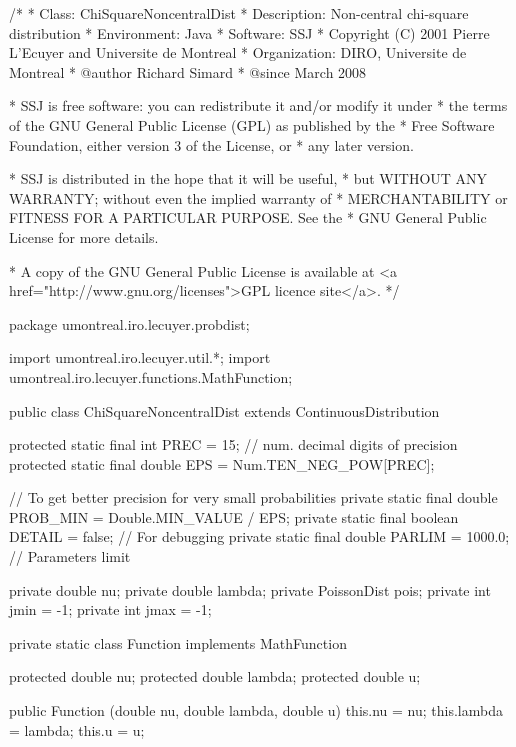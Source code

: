 \begin{code}\begin{hide}
/*
 * Class:        ChiSquareNoncentralDist
 * Description:  Non-central chi-square distribution
 * Environment:  Java
 * Software:     SSJ
 * Copyright (C) 2001  Pierre L'Ecuyer and Universite de Montreal
 * Organization: DIRO, Universite de Montreal
 * @author       Richard Simard
 * @since        March 2008

 * SSJ is free software: you can redistribute it and/or modify it under
 * the terms of the GNU General Public License (GPL) as published by the
 * Free Software Foundation, either version 3 of the License, or
 * any later version.

 * SSJ is distributed in the hope that it will be useful,
 * but WITHOUT ANY WARRANTY; without even the implied warranty of
 * MERCHANTABILITY or FITNESS FOR A PARTICULAR PURPOSE.  See the
 * GNU General Public License for more details.

 * A copy of the GNU General Public License is available at
   <a href="http://www.gnu.org/licenses">GPL licence site</a>.
 */
\end{hide}
package umontreal.iro.lecuyer.probdist;
\begin{hide}
import umontreal.iro.lecuyer.util.*;
import umontreal.iro.lecuyer.functions.MathFunction;
\end{hide}

public class ChiSquareNoncentralDist extends ContinuousDistribution\begin{hide} {

   protected static final int PREC = 15;   // num. decimal digits of precision
   protected static final double EPS = Num.TEN_NEG_POW[PREC];

   // To get better precision for very small probabilities
   private static final double PROB_MIN = Double.MIN_VALUE / EPS;
   private static final boolean DETAIL = false;   // For debugging
   private static final double PARLIM = 1000.0;   // Parameters limit

   private double nu;
   private double lambda;
   private PoissonDist pois;
   private int jmin = -1;
   private int jmax = -1;

   private static class Function implements MathFunction {
      protected double nu;
      protected double lambda;
      protected double u;

      public Function (double nu, double lambda, double u) {
         this.nu = nu;
         this.lambda = lambda;
         this.u = u;
      }

}}
\end{hide}
\end{code}
